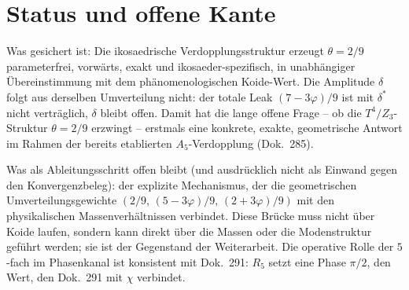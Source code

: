 \section{Status und offene Kante}
Was gesichert ist: Die ikosaedrische Verdopplungsstruktur erzeugt $\theta=2/9$ parameterfrei,
vorwärts, exakt und ikosaeder-spezifisch, in unabhängiger Übereinstimmung mit dem
phänomenologischen Koide-Wert. Die Amplitude $\delta$ folgt aus derselben Umverteilung nicht:
der totale Leak $(7-3\varphi)/9$ ist mit $\delta^\ast$ nicht verträglich, $\delta$ bleibt offen. Damit hat die lange offene Frage -- ob die $T^4/Z_3$-Struktur $\theta=2/9$
erzwingt -- erstmals eine konkrete, exakte, geometrische Antwort im Rahmen der bereits
etablierten $A_5$-Verdopplung (Dok.~285).

Was als Ableitungsschritt offen bleibt (und ausdrücklich nicht als Einwand gegen den
Konvergenzbeleg): der explizite Mechanismus, der die geometrischen Umverteilungsgewichte
$(2/9,\,(5-3\varphi)/9,\,(2+3\varphi)/9)$ mit den physikalischen Massenverhältnissen verbindet.
Diese Brücke muss nicht über Koide laufen, sondern kann direkt über die Massen oder die
Modenstruktur geführt werden; sie ist der Gegenstand der Weiterarbeit. Die operative
Rolle der $5$-fach im Phasenkanal ist konsistent mit Dok.~291: $R_5$ setzt eine Phase $\pi/2$,
den Wert, den Dok.~291 mit $\chi$ verbindet.
